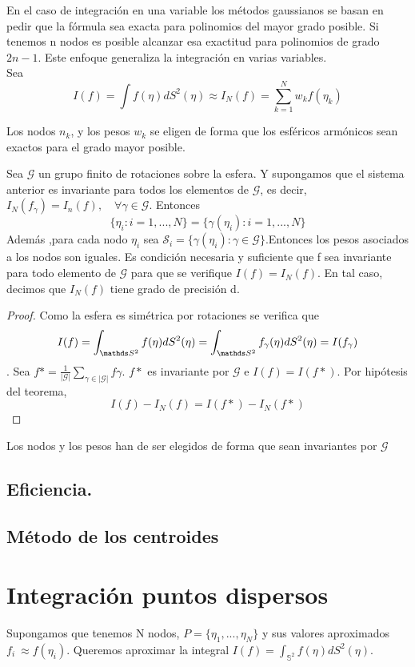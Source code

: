 En el caso de integración en una variable los métodos gaussianos se basan en pedir que la fórmula sea exacta para polinomios del mayor grado posible. Si tenemos n nodos es posible alcanzar esa exactitud para polinomios de grado $2n-1$. Este enfoque generaliza la integración en varias variables. \\
Sea $$
I(f)= \int f(\eta)dS^2(\eta) \approx I_N(f) = \sum_{k=1}^{N} w_kf(\eta_k)$$

Los nodos ${n_k}$, y los pesos ${w_k}$ se eligen de forma que los esféricos armónicos sean exactos para el grado mayor posible.

\begin{thm}Sea $\mathcal{G}$ un grupo finito de rotaciones sobre la esfera. Y supongamos que el sistema anterior es invariante para todos los elementos de $\mathcal{G}$, es decir, $I_N(f_\gamma)=I_n(f), \quad \forall \gamma \in \mathcal{G}$. Entonces $$\{\eta_i:i=1,...,N\}=\{\gamma(\eta_i):i=1,...,N\}$$ Además ,para cada nodo $\eta_i$ sea $\mathcal{S}_i=\{\gamma(\eta_i):\gamma \in \mathcal{G}\}$.Entonces los pesos asociados a los nodos son iguales. Es condición necesaria y suficiente que f sea invariante para todo elemento de $\mathcal{G}$ para que  se verifique $I(f)=I_N(f)$. En tal caso, decimos que $I_N(f)$ tiene grado de precisión d.

\end{thm}
\begin{proof}
Como la esfera es simétrica por rotaciones se verifica que $$I(f) = \int_{\esfera} f(\eta)dS^2(\eta) = \int_{\esfera} f_\gamma(\eta)dS^2(\eta) = I(f_\gamma)$$.
Sea $f* = \frac{1}{|\mathcal{G}|} \sum_{\gamma \in |\mathcal{G}| } f\gamma$. $f*$ es invariante por $\mathcal{G}$ e $I(f) = I(f*)$. Por hipótesis del teorema, $$
I(f)-I_N(f) = I(f*) - I_N(f*) $$
\end{proof}
Los nodos y los pesos han de ser elegidos de forma que sean invariantes por $\mathcal{G}$
\subsection{Eficiencia.}

\subsection{Método de los centroides}

\section{Integración puntos dispersos}
Supongamos que tenemos N nodos, $P=\{\eta_1,...,\eta_N\}$ y sus valores aproximados $f_i~\approx f(\eta_i)$. Queremos aproximar la integral $I(f) =  \int_{\mathds{S}^2} f(\eta)dS^2(\eta)$.


